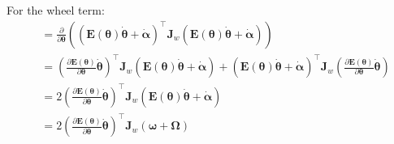 \documentclass[titlepage]{article}
\begin{document}
For the wheel term:
\begin{equation}
	\begin{split}
		&=\frac{\partial}{\partial\boldsymbol{\theta}}\left(\left(\boldsymbol{E}(\boldsymbol{\theta})\dot{\boldsymbol{\theta}}+\dot{\boldsymbol{\alpha}}\right)^\top\boldsymbol{J}_w\left(\boldsymbol{E}(\boldsymbol{\theta})\dot{\boldsymbol{\theta}}+\dot{\boldsymbol{\alpha}}\right)\right) \\
		&=\left(\frac{\partial\boldsymbol{E}(\boldsymbol{\theta})}{\partial\boldsymbol{\theta}}\dot{\boldsymbol{\theta}}\right)^\top\boldsymbol{J}_w\left(\boldsymbol{E}(\boldsymbol{\theta})\dot{\boldsymbol{\theta}}+\dot{\boldsymbol{\alpha}}\right)+\left(\boldsymbol{E}(\boldsymbol{\theta})\dot{\boldsymbol{\theta}}+\dot{\boldsymbol{\alpha}}\right)^\top\boldsymbol{J}_w\left(\frac{\partial\boldsymbol{E}(\boldsymbol{\theta})}{\partial\boldsymbol{\theta}}\dot{\boldsymbol{\theta}}\right) \\
		&=2\left(\frac{\partial\boldsymbol{E}(\boldsymbol{\theta})}{\partial\boldsymbol{\theta}}\dot{\boldsymbol{\theta}}\right)^\top\boldsymbol{J}_w\left(\boldsymbol{E}(\boldsymbol{\theta})\dot{\boldsymbol{\theta}}+\dot{\boldsymbol{\alpha}}\right) \\
		&=2\left(\frac{\partial\boldsymbol{E}(\boldsymbol{\theta})}{\partial\boldsymbol{\theta}}\dot{\boldsymbol{\theta}}\right)^\top\boldsymbol{J}_w\left(\boldsymbol{\omega}+\boldsymbol{\Omega}\right)
	\end{split}
\end{equation}
\end{document}
